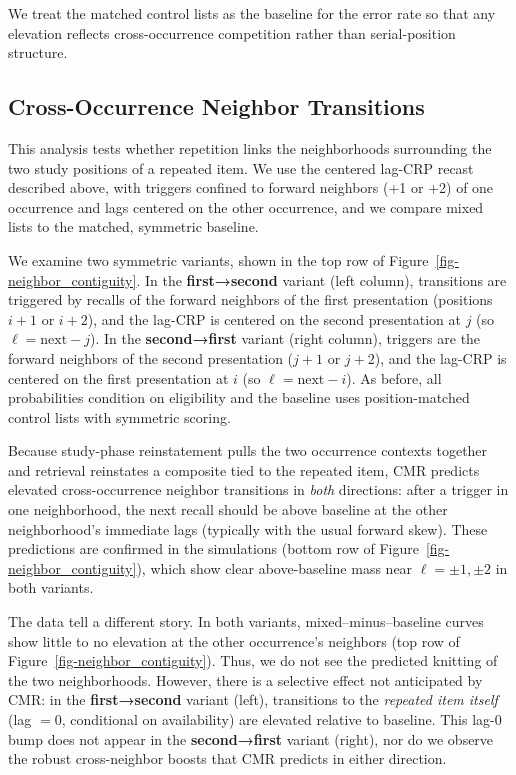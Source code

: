 \documentclass[
  man,
  floatsintext,
  longtable,
  nolmodern,
  notxfonts,
  notimes,
  draftfirst,
  colorlinks=true,linkcolor=blue,citecolor=blue,urlcolor=blue]{apa7}
\begin{document}
We treat the matched control lists as the baseline for the error rate so
that any elevation reflects cross-occurrence competition rather than
serial-position structure.

\subsection{Cross-Occurrence Neighbor
Transitions}\label{cross-occurrence-neighbor-transitions}

This analysis tests whether repetition links the neighborhoods
surrounding the two study positions of a repeated item. We use the
centered lag-CRP recast described above, with triggers confined to
forward neighbors (+1 or +2) of one occurrence and lags centered on the
other occurrence, and we compare mixed lists to the matched, symmetric
baseline.

We examine two symmetric variants, shown in the top row of
Figure~\ref{fig-neighbor_contiguity}. In the \textbf{first→second}
variant (left column), transitions are triggered by recalls of the
forward neighbors of the first presentation (positions \(i{+}1\) or
\(i{+}2\)), and the lag-CRP is centered on the second presentation at
\(j\) (so \(\ell=\text{next}-j\)). In the \textbf{second→first} variant
(right column), triggers are the forward neighbors of the second
presentation (\(j{+}1\) or \(j{+}2\)), and the lag-CRP is centered on
the first presentation at \(i\) (so \(\ell=\text{next}-i\)). As before,
all probabilities condition on eligibility and the baseline uses
position-matched control lists with symmetric scoring.

Because study-phase reinstatement pulls the two occurrence contexts
together and retrieval reinstates a composite tied to the repeated item,
CMR predicts elevated cross-occurrence neighbor transitions in
\emph{both} directions: after a trigger in one neighborhood, the next
recall should be above baseline at the other neighborhood's immediate
lags (typically with the usual forward skew). These predictions are
confirmed in the simulations (bottom row of
Figure~\ref{fig-neighbor_contiguity}), which show clear above-baseline
mass near \(\ell=\pm1,\pm2\) in both variants.

The data tell a different story. In both variants,
mixed--minus--baseline curves show little to no elevation at the other
occurrence's neighbors (top row of
Figure~\ref{fig-neighbor_contiguity}). Thus, we do not see the predicted
knitting of the two neighborhoods. However, there is a selective effect
not anticipated by CMR: in the \textbf{first→second} variant (left),
transitions to the \emph{repeated item itself} (lag \(=0\), conditional
on availability) are elevated relative to baseline. This lag-0 bump does
not appear in the \textbf{second→first} variant (right), nor do we
observe the robust cross-neighbor boosts that CMR predicts in either
direction.
\end{document}
